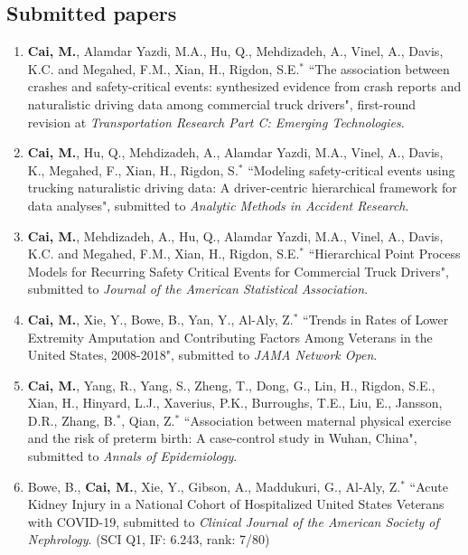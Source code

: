 \documentclass[11pt, a4paper]{article}
\begin{document}
	\subsection*{Submitted papers}
	\begin{enumerate}[leftmargin=0ex,itemsep=1ex]
		\item \textbf{Cai, M.}, Alamdar Yazdi, M.A., Hu, Q., Mehdizadeh, A., Vinel, A., Davis, K.C. and Megahed, F.M., Xian, H., Rigdon, S.E.$^\ast$ ``The association between crashes and safety-critical events: synthesized evidence from crash reports and naturalistic driving data among commercial truck drivers", first-round revision at \emph{Transportation Research Part C: Emerging Technologies}.
		
		\item \textbf{Cai, M.}, Hu, Q., Mehdizadeh, A., Alamdar Yazdi, M.A., Vinel, A., Davis, K., Megahed, F., Xian, H., Rigdon, S.$^\ast$ ``Modeling safety-critical events using trucking naturalistic driving data: A driver-centric hierarchical framework for data analyses", submitted to \emph{Analytic Methods in Accident Research}.
		
		\item \textbf{Cai, M.}, Mehdizadeh, A., Hu, Q., Alamdar Yazdi, M.A., Vinel, A., Davis, K.C. and Megahed, F.M., Xian, H., Rigdon, S.E.$^\ast$ ``Hierarchical Point Process Models for Recurring Safety Critical Events for Commercial Truck Drivers", submitted to \emph{Journal of the American Statistical Association}.
		
		\item \textbf{Cai, M.}, Xie, Y., Bowe, B., Yan, Y., Al-Aly, Z.$^\ast$ ``Trends in Rates of Lower Extremity Amputation and Contributing Factors Among Veterans in the United States, 2008-2018", submitted to \emph{JAMA Network Open}.
		
		\item \textbf{Cai, M.}, Yang, R., Yang, S., Zheng, T., Dong, G., Lin, H., Rigdon, S.E., Xian, H., Hinyard, L.J., Xaverius, P.K., Burroughs, T.E., Liu, E., Jansson, D.R., Zhang, B.$^\ast$, Qian, Z.$^\ast$ ``Association between maternal physical exercise and the risk of preterm birth: A case-control study in Wuhan, China", submitted to \emph{Annals of Epidemiology}.
		
		\item Bowe, B., \textbf{Cai, M.}, Xie, Y., Gibson, A., Maddukuri, G., Al-Aly, Z.$^\ast$ ``Acute Kidney Injury in a National Cohort of Hospitalized United States Veterans with COVID-19, submitted to \emph{Clinical Journal of the American Society of Nephrology}. (SCI Q1, IF: 6.243, rank: 7/80)
		

\end{enumerate}
\end{document}
